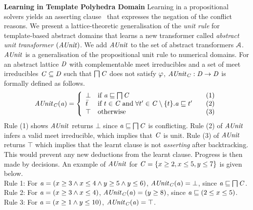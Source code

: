 \noindent \textbf{Learning in Template Polyhedra Domain}
%
Learning in a propositional solvers yields an asserting clause~\cite{cdcl}
that expresses the negation of the conflict reasons.  We present a
lattice-theoretic generalisation of the {\em unit rule} for template-based
abstract domains that learns a new transformer called {\em abstract unit
transformer} $(\mathit{AUnit})$.  We add $\mathit{AUnit}$ to the set of abstract
transformers $\mathcal{A}$.  $\mathit{AUnit}$ is a generalisation of the
propositional unit rule to numerical domains.  For an abstract lattice
$\mathit{D}$ with complementable meet irreducibles and a set of meet
irreducibles $\mathit{C} \subseteq \mathit{D}$ such that $\bigsqcap
\mathit{C}$ does not satisfy $\varphi$, $\mathit{AUnit}_{\mathit{C}}: \mathit{D}
\rightarrow \mathit{D}$ is formally defined as follows.
%
\[ \aunit_\conflictset(\absval) =
 \left\{\begin{array}{l@{\quad}l@{\qquad}l}
  \bot       & \text{if } \absval \sqsubseteq \bigsqcap \conflictset & (1)\\
  \bar{t}    & \text{if } t \in \conflictset \; \text{and} \; \forall t' \in \conflictset
  \setminus \{t\}. \absval  \sqsubseteq t' & (2) \\
  \top & \text{otherwise} & (3) \\
 \end{array}\right.
\]
%
Rule (1) shows $\mathit{AUnit}$ returns $\bot$ since $\mathit{a} \sqsubseteq \bigsqcap
\mathit{C}$ is conflicting.  Rule (2) of $\mathit{AUnit}$ infers a valid meet
irreducible, which implies that $\mathit{C}$ is unit.  Rule (3) of
$\mathit{AUnit}$ returns $\top$ which implies that the learnt clause is not {\em
asserting} after backtracking.  This would prevent any new deductions from
the learnt clause.  Progress is then made by decisions.  An example of
$\mathit{AUnit}$ for $\mathit{C} = \{x \geq 2, x \leq 5, y \leq 7 \}$ is given
below.  \\
%
Rule 1: 
For $\mathit{a} = (x \geq 3\wedge\allowbreak x \leq
4\wedge\allowbreak y \geq 5\wedge y \leq 6)$, 
$\mathit{AUnit}_{\mathit{C}}(\mathit{a}) = \bot$, since $\mathit{a}
\sqsubseteq \bigsqcap\mathit{C}$.  \\ 
Rule 2:  
For $\mathit{a} = (x \geq 3\wedge x \leq 4)$,  
$\mathit{AUnit}_{\mathit{C}}(\mathit{a}) = (y \geq 8)$, since
$\mathit{a} \sqsubseteq (2 \leq x \leq 5)$. \\ 
%
Rule 3: 
For $\mathit{a} = (x \geq 1\wedge y \leq 10)$, 
$\mathit{AUnit}_{\mathit{C}}(\mathit{a}) = \top$. \\


